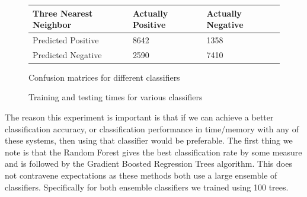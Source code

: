 \documentclass[ %
                    author={Sam Phippen},
                supervisor={Dr. Rafal Bogacz},
                     title={Real time voice activity detectors in noisy personal computing environments},
                  subtitle={},
                    degree={MEng},
                      year={2012} ]{thesis}
\begin{document}
\begin{figure}
{    \begin{tabular}{|l||l|l|}
        \hline
        Three Nearest Neighbor & Actually Positive & Actually Negative \\ \hline
        Predicted Positive     & 8642              & 1358               \\ \hline
        Predicted Negative     & 2590              & 7410              \\ \hline
    \end{tabular}

    \vspace{0.7500cm}

}
    \caption{Confusion matrices for different classifiers}
    \label{fig:multiclass-confusion}

\end{figure}

\begin{figure}

    \caption{Training and testing times for various classifiers}

    \label{fig:multiclass-speed}
\end{figure}

The reason this experiment is important is that if we can achieve a better
classification accuracy, or classification performance in time/memory with any
of these systems, then using that classifier would be preferable. The first
thing we note is that the Random Forest gives the best classification rate by
some measure and is followed by the Gradient Boosted Regression Trees
algorithm. This does not contravene expectations as these methods both use a
large ensemble of classifiers. Specifically for both ensemble classifiers we
trained using 100 trees.
\end{document}
